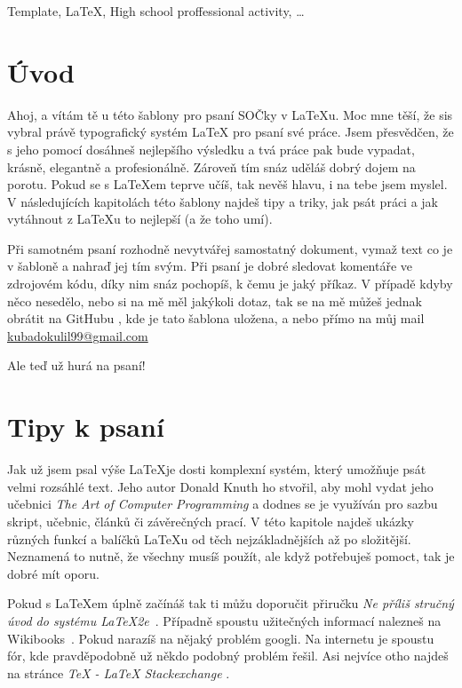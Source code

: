 \documentclass[12pt, a4paper,
 twoside,        %
 openright
]{report}
\begin{document}

\noindent Template, \LaTeX, High school proffessional activity, \dots 

\cleardoublepage

\tableofcontents

\pagestyle{fancy}
\setcounter{page}{1}

\chapter*{Úvod}
Ahoj,
a vítám tě u této šablony pro psaní SOČky v \LaTeX u. Moc mne těší, že sis vybral právě typografický systém \LaTeX{ } pro psaní své práce. Jsem přesvědčen, že s jeho pomocí dosáhneš nejlepšího výsledku a tvá práce pak bude vypadat, krásně, elegantně a profesionálně. Zároveň tím snáz uděláš dobrý dojem na porotu. Pokud se s \LaTeX em teprve učíš, tak nevěš hlavu, i na tebe jsem myslel. V následujících kapitolách této šablony najdeš tipy a triky, jak psát práci a jak vytáhnout z \LaTeX u to nejlepší (a že toho umí). 

Při samotném psaní rozhodně nevytvářej samostatný dokument, vymaž text co je v šabloně a nahraď jej tím svým. Při psaní je dobré sledovat komentáře ve zdrojovém kódu, díky nim snáz pochopíš, k čemu je jaký příkaz. V případě kdyby něco nesedělo, nebo si na mě měl jakýkoli dotaz, tak se na mě můžeš jednak obrátit na GitHubu \cite{sablonaSOC}, kde je tato šablona uložena, a nebo přímo na můj mail \url{kubadokulil99@gmail.com} %

Ale teď už hurá na psaní!

\chapter{Tipy k psaní}

Jak už jsem psal výše \LaTeX je dosti komplexní systém, který umožňuje psát velmi rozsáhlé text. Jeho autor Donald Knuth ho stvořil, aby mohl vydat jeho učebnici \emph{The Art of Computer Programming} a dodnes se je využíván pro sazbu skript, učebnic, článků či závěrečných prací. V této kapitole najdeš ukázky různých funkcí a balíčků \LaTeX u od těch nejzákladnějších až po složitější. Neznamená to nutně, že všechny musíš použít, ale když potřebuješ pomoct, tak je dobré mít oporu. 

Pokud s \LaTeX em úplně začínáš tak ti můžu doporučit přiručku \emph{Ne příliš stručný úvod do systému \LaTeX2e}~\cite{LaTeXprirucka}. Případně spoustu užitečných informací nalezneš na Wikibooks~\cite{wikibooksLaTeX}. Pokud narazíš na nějaký problém googli. Na internetu je spoustu fór, kde pravděpodobně už někdo podobný problém řešil. Asi nejvíce otho najdeš na stránce \emph{TeX - LaTeX Stackexchange} \cite{stackExchange}.
\end{document}
